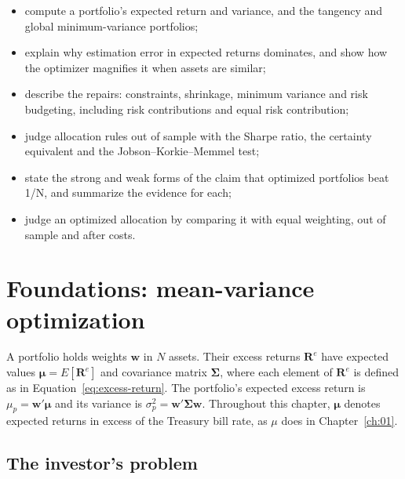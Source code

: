 \begin{itemize}
  \item compute a portfolio's expected return and variance, and the tangency and global minimum-variance portfolios;
  \item explain why estimation error in expected returns dominates, and show how the optimizer magnifies it when assets are similar;
  \item describe the repairs: constraints, shrinkage, minimum variance and risk budgeting, including risk contributions and equal risk contribution;
  \item judge allocation rules out of sample with the Sharpe ratio, the certainty equivalent and the Jobson--Korkie--Memmel test;
  \item state the strong and weak forms of the claim that optimized portfolios beat 1/N, and summarize the evidence for each;
  \item judge an optimized allocation by comparing it with equal weighting, out of sample and after costs.
\end{itemize}

\section{Foundations: mean-variance optimization}
\label{sec:19-foundations}

A portfolio holds weights $\mathbf{w}$ in $N$ assets. Their excess returns $\mathbf{R}^{e}$ have expected values $\boldsymbol{\mu} = E[\mathbf{R}^{e}]$ and covariance matrix $\boldsymbol{\Sigma}$, where each element of $\mathbf{R}^{e}$ is defined as in Equation~\eqref{eq:excess-return}. The portfolio's expected excess return is $\mu_p = \mathbf{w}'\boldsymbol{\mu}$ and its variance is $\sigma_p^2 = \mathbf{w}'\boldsymbol{\Sigma}\mathbf{w}$. Throughout this chapter, $\boldsymbol{\mu}$ denotes expected returns in excess of the Treasury bill rate, as $\mu$ does in Chapter~\ref{ch:01}.

\subsection{The investor's problem}
\label{sec:19-problem}


